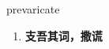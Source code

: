 
\begin{frame}
{\huge prevaricate}
\begin{center}
\begin{enumerate}\Large
  \item \textbf{支吾其词，撒谎}
\end{enumerate}
\end{center}
\end{frame}
